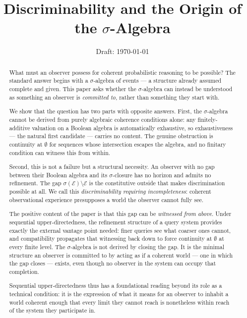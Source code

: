\documentclass[12pt]{article}
\title{Discriminability and the Origin of the $\sigma$-Algebra}
\author{}
\date{Draft: \today}
\theoremstyle{definition}
\theoremstyle{remark}
\newcommand{\E}{\mathcal{E}}
\newcommand{\sigE}{\sigma(\mathcal{E})}
\begin{document}
\maketitle

\begin{abstract}
What must an observer possess for coherent probabilistic reasoning to be possible?
The standard answer begins with a $\sigma$-algebra of events --- a structure already
assumed complete and given.  This paper asks whether the $\sigma$-algebra can instead
be understood as something an observer is \emph{committed to}, rather than something
they start with.

We show that the question has two parts with opposite answers.  First, the
$\sigma$-algebra cannot be derived from purely algebraic coherence conditions alone:
any finitely-additive valuation on a Boolean algebra is automatically exhaustive, so
exhaustiveness --- the natural first candidate --- carries no content.  The genuine
obstruction is continuity at $\emptyset$ for sequences whose intersection escapes the
algebra, and no finitary condition can witness this from within.

Second, this is not a failure but a structural necessity.  An observer with no gap
between their Boolean algebra and its $\sigma$-closure has no horizon and admits no
refinement.  The gap $\sigE \setminus \E$ is the constitutive outside that makes
discrimination possible at all.  We call this \emph{discriminability requiring
incompleteness}: coherent observational experience presupposes a world the observer
cannot fully see.

The positive content of the paper is that this gap can be \emph{witnessed from above}.
Under sequential upper-directedness, the refinement structure of a query system provides
exactly the external vantage point needed: finer queries see what coarser ones cannot,
and compatibility propagates that witnessing back down to force continuity at $\emptyset$
at every finite level.  The $\sigma$-algebra is not derived by closing the gap.  It is
the minimal structure an observer is committed to by acting as if a coherent world ---
one in which the gap closes --- exists, even though no observer in the system can
occupy that completion.

Sequential upper-directedness thus has a foundational reading beyond its role as a
technical condition: it is the expression of what it means for an observer to inhabit
a world coherent enough that every limit they cannot reach is nonetheless within reach
of the system they participate in.
\end{abstract}
\end{document}
